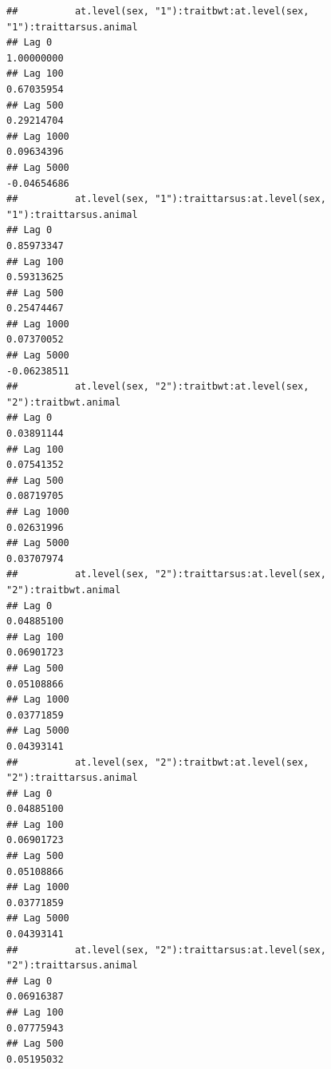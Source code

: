\documentclass[
  12pt,
]{book}
\begin{document}
\begin{verbatim}
##          at.level(sex, "1"):traitbwt:at.level(sex, "1"):traittarsus.animal
## Lag 0                                                           1.00000000
## Lag 100                                                         0.67035954
## Lag 500                                                         0.29214704
## Lag 1000                                                        0.09634396
## Lag 5000                                                       -0.04654686
##          at.level(sex, "1"):traittarsus:at.level(sex, "1"):traittarsus.animal
## Lag 0                                                              0.85973347
## Lag 100                                                            0.59313625
## Lag 500                                                            0.25474467
## Lag 1000                                                           0.07370052
## Lag 5000                                                          -0.06238511
##          at.level(sex, "2"):traitbwt:at.level(sex, "2"):traitbwt.animal
## Lag 0                                                        0.03891144
## Lag 100                                                      0.07541352
## Lag 500                                                      0.08719705
## Lag 1000                                                     0.02631996
## Lag 5000                                                     0.03707974
##          at.level(sex, "2"):traittarsus:at.level(sex, "2"):traitbwt.animal
## Lag 0                                                           0.04885100
## Lag 100                                                         0.06901723
## Lag 500                                                         0.05108866
## Lag 1000                                                        0.03771859
## Lag 5000                                                        0.04393141
##          at.level(sex, "2"):traitbwt:at.level(sex, "2"):traittarsus.animal
## Lag 0                                                           0.04885100
## Lag 100                                                         0.06901723
## Lag 500                                                         0.05108866
## Lag 1000                                                        0.03771859
## Lag 5000                                                        0.04393141
##          at.level(sex, "2"):traittarsus:at.level(sex, "2"):traittarsus.animal
## Lag 0                                                              0.06916387
## Lag 100                                                            0.07775943
## Lag 500                                                            0.05195032

\end{verbatim}
\end{document}
